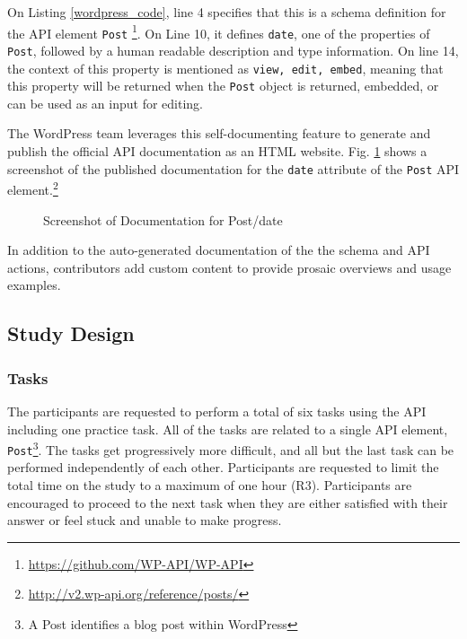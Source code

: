 On Listing \ref{wordpress_code}, line 4 specifies that this is a schema definition for the API element \lstinline{Post} \footnote{\url{https://github.com/WP-API/WP-API}}. On Line 10, it defines \lstinline{date}, one of the properties of \lstinline{Post}, followed by a human readable description and type information. On line 14, the context of this property is mentioned as \lstinline{view, edit, embed}, meaning that this property will be returned when the \lstinline{Post} object is returned, embedded, or can be used as an input for editing.

The WordPress team leverages this self-documenting feature to generate and publish the official API documentation as an HTML website. Fig. \ref{fig:schema} shows a screenshot of the published documentation for the \lstinline{date} attribute of the \lstinline{Post} API element.\footnote{\url{http://v2.wp-api.org/reference/posts/}}

\begin{figure}
  \begin{center}
  \end{center}
  \caption{Screenshot of Documentation for Post/date}
  \label{fig:schema}
\end{figure}

In addition to the auto-generated documentation of the the schema and API actions, contributors add custom content to provide prosaic overviews and usage examples.



\subsection{Study Design} %
\subsubsection{Tasks} %

The participants are requested to perform a total of six tasks using the API including one practice task. All of the tasks are related to a single API element, \lstinline{Post}\footnote{A Post identifies a blog post within WordPress}. The tasks get progressively more difficult, and all but the last task can be performed independently of each other. Participants are requested to limit the total time on the study to a maximum of one hour (R3). Participants are encouraged to proceed to the next task when they are either satisfied with their answer or feel stuck and unable to make progress.

